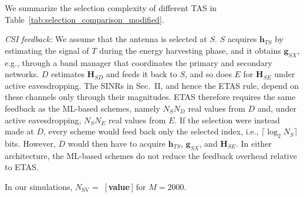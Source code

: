 We summarize the  selection complexity of
different TAS  in Table~\ref{tab:selection_comparison_modified}.
{\color{blue}
\emph{CSI feedback:} We assume that the antenna is selected at $S$. $S$
acquires $\mathbf{h}_{TS}$ by estimating the signal of $T$ during the
energy harvesting phase, and it obtains $\mathbf{g}_{SX}$, e.g., through
a band manager that coordinates the primary and secondary networks. $D$
estimates $\mathbf{H}_{SD}$ and feeds it back to $S$, and so does $E$
for $\mathbf{H}_{SE}$ under active eavesdropping. The SINRs in Sec.~II,
and hence the ETAS rule, depend on these channels only through their
magnitudes. ETAS therefore requires the same feedback as the ML-based
schemes, namely $N_SN_D$ real values from $D$ and, under active
eavesdropping, $N_SN_E$ real values from $E$. If the selection were
instead made at $D$, every scheme would feed back only the selected
index, i.e., $\lceil\log_2N_S\rceil$ bits. However, $D$ would then have
to acquire $\mathbf{h}_{TS}$, $\mathbf{g}_{SX}$, and $\mathbf{H}_{SE}$.
In either architecture, the ML-based schemes do not reduce the feedback
overhead relative to ETAS.


In our simulations, $N_{\mathrm{SV}}=$~[\,\textbf{value}\,] for
$M=2000$.


}
